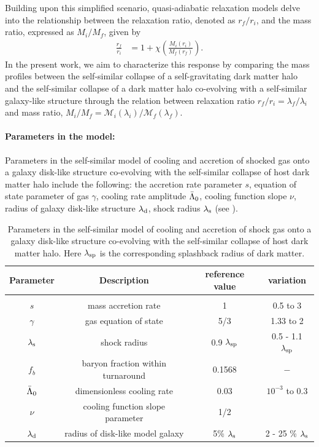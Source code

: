 Building upon this simplified scenario, quasi-adiabatic relaxation models delve into the relationship between the relaxation ratio, denoted as $r_f/r_i$, and the mass ratio, expressed as $M_i/M_f$, given by \citep[]{2010Abadi_NFBS,2011TeyssierMMDM,2021ParanjapeTirthSheth,2023Velmani&Paranjape} %
\begin{align}
\frac{r_f}{r_i} &= 1 + \chi \left( \frac{M_i(r_i)}{M_f(r_f)} \right) .
\label{eq:qAR-ch:ssr}
\end{align}
In the present work, we aim to characterize this response by comparing the mass profiles between the self-similar collapse of a self-gravitating dark matter halo and the self-similar collapse of a dark matter halo co-evolving with a self-similar galaxy-like structure through the relation between relaxation ratio 
$r_f/r_i=\lambda_f/\lambda_i$ and mass ratio, $M_i/M_f=\mathcal{M}_i(\lambda_i)/\mathcal{M}_f(\lambda_f)$.



\paragraph{Parameters in the model:}
Parameters in the self-similar model of cooling and accretion of shocked gas onto a galaxy disk-like structure co-evolving with the self-similar collapse of host dark matter halo include the following:
the accretion rate parameter $s$, equation of state parameter of gas $\gamma$, cooling rate amplitude $\Bar{\Lambda}_0$, cooling function slope $\nu$, radius of galaxy disk-like structure $\lambda_{\rm d}$, shock radius $\lambda_{\rm s}$ (see ).


\begin{table}[htbp]
\centering
\begin{tabular}{c|c|c|c}%
\hline
Parameter & Description & reference value & variation \\
\hline &&&\\
$s$ & mass accretion rate & 1 & 0.5 to 3 \\
$\gamma$ & gas equation of state & 5/3 & 1.33 to 2  \\
$\lambda_{\rm s}$ & shock radius & 0.9 $\lambda_{\rm sp}$ & 0.5 - 1.1 $\lambda_{\rm sp}$ \\
$f_b$ & baryon fraction within turnaround & 0.1568 & $-$\\
$\Bar{\Lambda}_0$ & dimensionless cooling rate & $0.03$ & $10^{-3}$ to $0.3$ \\
$\nu$ & cooling function slope parameter & 1/2 & \\
$\lambda_{\rm d}$ & radius of disk-like model galaxy & 5\% $\lambda_{\rm s}$ & 2 - 25 \% $\lambda_{\rm s}$  \\
\hline 
\end{tabular}
\caption{Parameters in the self-similar model of cooling and accretion of shock gas onto a galaxy disk-like structure co-evolving with the self-similar collapse of host dark matter halo. Here $\lambda_{\rm sp}$ is the corresponding splashback radius of dark matter.}
\label{tab:parameters-descr-ch:ssr}
\end{table}


